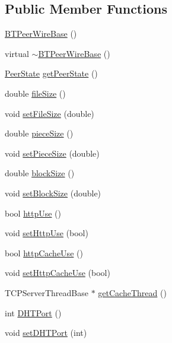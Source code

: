 \subsection*{Public Member Functions}
\begin{DoxyCompactItemize}
\item 
\hyperlink{classBTPeerWireBase_ac0f4fe0fb674d693ec56e936b07ec9ce}{B\+T\+Peer\+Wire\+Base} ()
\item 
virtual \hyperlink{classBTPeerWireBase_a973e3484fdff1603e77aab6b8dc036b7}{$\sim$\+B\+T\+Peer\+Wire\+Base} ()
\item 
\hyperlink{classPeerState}{Peer\+State} \hyperlink{classBTPeerWireBase_aaece1bc1f54f78f704a6d8f122866ec8}{get\+Peer\+State} ()
\item 
double \hyperlink{classBTPeerWireBase_a5ba1f14a19dfbc488080c0fde88e1440}{file\+Size} ()
\item 
void \hyperlink{classBTPeerWireBase_a424ebf4ed4a42eb208939f198d7fb7f4}{set\+File\+Size} (double)
\item 
double \hyperlink{classBTPeerWireBase_ac66fc52cacb612adfa1314eb06610afe}{piece\+Size} ()
\item 
void \hyperlink{classBTPeerWireBase_a49e5078e88e79d72256f94b604503b2f}{set\+Piece\+Size} (double)
\item 
double \hyperlink{classBTPeerWireBase_a876a1131637f5db2ae216fe7ac19332a}{block\+Size} ()
\item 
void \hyperlink{classBTPeerWireBase_a070f6c47f701e48e7843f731ec07c1a4}{set\+Block\+Size} (double)
\item 
bool \hyperlink{classBTPeerWireBase_ad75a24948d3225218fdcba16a3b97152}{http\+Use} ()
\item 
void \hyperlink{classBTPeerWireBase_a80ba3561ebe152f11b19081e2193bbf0}{set\+Http\+Use} (bool)
\item 
bool \hyperlink{classBTPeerWireBase_aa06acdd860849b17b073c9eedffc5fab}{http\+Cache\+Use} ()
\item 
void \hyperlink{classBTPeerWireBase_ac1292272489b42e6c5e012247f05ad77}{set\+Http\+Cache\+Use} (bool)
\item 
T\+C\+P\+Server\+Thread\+Base $\ast$ \hyperlink{classBTPeerWireBase_a200ae42b2d1b1b107b6dc5de99da0dc7}{get\+Cache\+Thread} ()
\item 
int \hyperlink{classBTPeerWireBase_ac638e905388b0d4a3fdfba66d4e1a995}{D\+H\+T\+Port} ()
\item 
void \hyperlink{classBTPeerWireBase_a10bffb581df8f5365309cd74c780d9ad}{set\+D\+H\+T\+Port} (int)
\item 

\end{DoxyCompactItemize}
